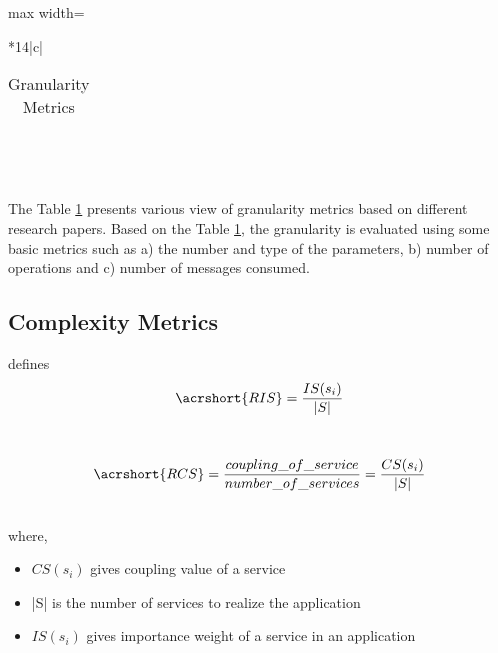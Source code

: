 {{{{\begin{table}[h!]
\begin{adjustbox}{max width=\textwidth}
\begin{tabular}{*{14}{|c}|}
\begin{tabular}{cl}
                    \end{tabular}\\
                    \hline
\end{tabular}
\end{adjustbox}
  \caption{Granularity Metrics}
  \label{tab:quality_of_service/quality_attributes/granularity_metrics}
\end{table}
\\
The Table \ref{tab:quality_of_service/quality_attributes/granularity_metrics} presents various view of granularity metrics based on different research papers. Based on the Table \ref{tab:quality_of_service/quality_attributes/granularity_metrics}, the granularity is evaluated using some basic metrics such as a) the number and type of the parameters, b) number of operations and c) number of messages consumed.
\\

\subsection{Complexity Metrics}{\label{section:quality_of_service/quality_metrics/complexity}

\cite{Zhang:2009aa} defines
$$ \acrshort{RIS} = \frac{IS(s_i)}{|S|}$$

\\

$$  \acrshort{RCS} = \frac{coupling\_of\_service}{number\_of\_services} = \frac{CS(s_i)}{|S|}$$

\\
where,
\\
\begin{itemize}[leftmargin=.5in]
\item $CS(s_i)$ gives coupling value of a service
\item |S| is the number of services to realize the application
\item $IS(s_i)$ gives importance weight of a service in an application
\end{itemize}

}}}}}
